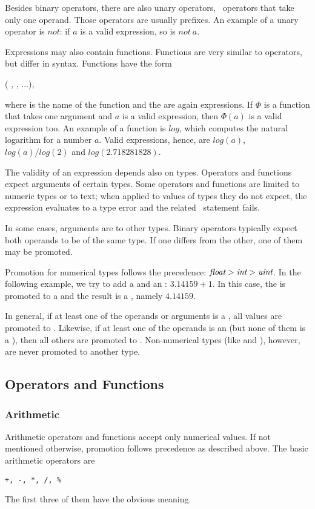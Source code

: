 Besides binary operators, there are also
unary operators, \ie\ operators that
take only one operand. Those operators
are usually prefixes. An example of
a unary operator is $not$:
if $a$ is a valid expression,
so is $not~a$.

Expressions may also contain
functions. Functions are very
similar to operators, but differ
in syntax. Functions have the
form

(
,
,
$\dots$),

where  is the name
of the function and the 
are again expressions.
If $\Phi$ is a function
that takes one argument and
$a$ is a valid expression,
then $\Phi(a)$ is a valid expression too.
An example of a function is $log$,
which computes the natural logarithm
for a number $a$. Valid expressions,
hence, are $log(a)$, $log(a)/log(2)$ and
$log(2.718281828)$.

The validity of an expression depends
also on types. Operators and functions
expect arguments of certain types.
Some operators and functions are limited
to numeric types or to text; when applied
to values of types they do not expect,
the expression evaluates to a type error
and the related \sql\ statement fails.

In some cases, arguments are 
to other types. Binary operators typically
expect both operands to be of the same type.
If one differs from the other, one of them
may be promoted.

Promotion for numerical types follows 
the precedence:
$\textit{float} > \textit{int} > \textit{uint}$.
In the following example, we try to
add a  and an :
$3.14159 + 1$. In this case, the 
is promoted to a  and the
result is a ,
namely $4.14159$.

In general, if at least one of the
operands or arguments is a ,
all values are promoted to .
Likewise, if at least one of the operands
is an  (but none of them is a ),
then all others are promoted to .
Non-numerical types (like  and ),
however, are never promoted to another type.

\subsection{Operators and Functions}
\subsubsection{Arithmetic}
Arithmetic operators and functions
accept only numerical values.
If not mentioned otherwise,
promotion follows precedence as described above.
The basic arithmetic operators are
\begin{verbatim}
+, -, *, /, %
\end{verbatim}
The first three of them have the obvious meaning.

